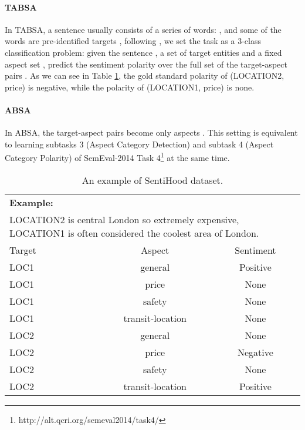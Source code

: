 \documentclass[11pt,a4paper]{article}
\theoremstyle{definition}
\begin{document}
	\paragraph{TABSA}	In TABSA, a sentence  usually consists of a series of words: , and some of the words  are pre-identified targets , following \citet{saeidi2016sentihood}, we set the task as a 3-class classification problem: given the sentence , a set of target entities  and a fixed aspect set , predict the sentiment polarity  over the full set of the target-aspect pairs . As we can see in Table \ref{example}, the gold standard polarity of (LOCATION2, price) is negative, while the polarity of (LOCATION1, price) is none.

	\paragraph{ABSA} In ABSA, the target-aspect pairs  become only aspects . This setting is equivalent to learning subtasks 3 (Aspect Category Detection) and subtask 4 (Aspect Category Polarity) of SemEval-2014 Task 4\footnote{http://alt.qcri.org/semeval2014/task4/} at the same time.

	\begin{table}[ht]
		\centering
		\begin{tabular}{l c c}
			\toprule
            \textbf{Example:}\\
            \multicolumn{3}{p{\linewidth }}{\textcolor[rgb]{1.00,0.00,0.00}{LOCATION2} is central London so extremely expensive, \textcolor[rgb]{0.00,0.00,1.00}{LOCATION1} is often considered the coolest area of London.}\\
            \midrule
            \midrule
			Target & Aspect & Sentiment \\
			\cline{1-3}
			LOC1 & general & Positive \\
			LOC1 & price & None \\
			LOC1 & safety & None \\
			LOC1 & transit-location & None \\
			LOC2 & general & None \\
			LOC2 & price & Negative \\
			LOC2 & safety & None \\
			LOC2 & transit-location & Positive \\
			\bottomrule
		\end{tabular}
	\caption{\label{example} An example of SentiHood dataset.}
	\end{table}
	
\end{document}
